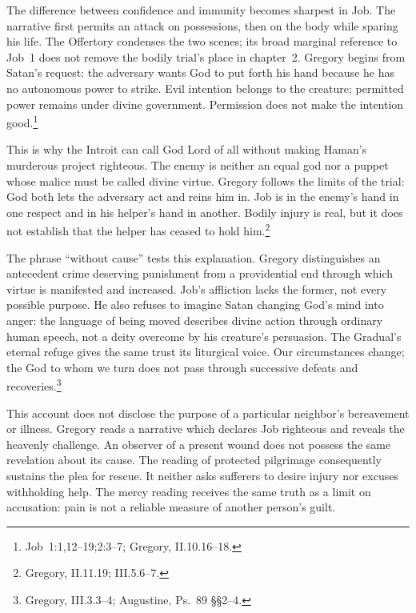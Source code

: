 The difference between confidence and immunity becomes sharpest in Job. The narrative first permits an attack on possessions, then on the body while sparing his life. The Offertory condenses the two scenes; its broad marginal reference to Job~1 does not remove the bodily trial's place in chapter~2. Gregory begins from Satan's request: the adversary wants God to put forth his hand because he has no autonomous power to strike. Evil intention belongs to the creature; permitted power remains under divine government. Permission does not make the intention good.\footnote{Job~1:1,12--19;2:3--7; Gregory,  II.10.16--18.}

This is why the Introit can call God Lord of all without making Haman's murderous project righteous. The enemy is neither an equal god nor a puppet whose malice must be called divine virtue. Gregory follows the limits of the trial: God both lets the adversary act and reins him in. Job is in the enemy's hand in one respect and in his helper's hand in another. Bodily injury is real, but it does not establish that the helper has ceased to hold him.\footnote{Gregory,  II.11.19; III.5.6--7.}

The phrase ``without cause'' tests this explanation. Gregory distinguishes an antecedent crime deserving punishment from a providential end through which virtue is manifested and increased. Job's affliction lacks the former, not every possible purpose. He also refuses to imagine Satan changing God's mind into anger: the language of being moved describes divine action through ordinary human speech, not a deity overcome by his creature's persuasion. The Gradual's eternal refuge gives the same trust its liturgical voice. Our circumstances change; the God to whom we turn does not pass through successive defeats and recoveries.\footnote{Gregory,  III.3.3--4; Augustine, Ps.~89 \S\S2--4.}

This account does not disclose the purpose of a particular neighbor's bereavement or illness. Gregory reads a narrative which declares Job righteous and reveals the heavenly challenge. An observer of a present wound does not possess the same revelation about its cause. The reading of protected pilgrimage consequently sustains the plea for rescue. It neither asks sufferers to desire injury nor excuses withholding help. The mercy reading receives the same truth as a limit on accusation: pain is not a reliable measure of another person's guilt.

